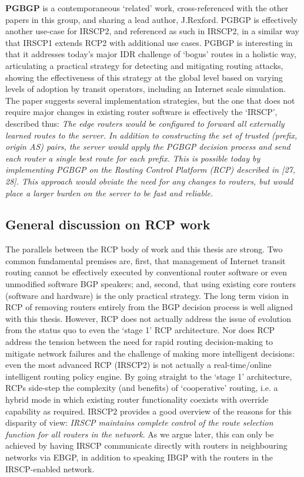 \textbf{PGBGP} \cite{Karlin2006} is a contemporaneous `related' work, cross-referenced with the other papers in this group, and sharing a lead author, J.Rexford.
PGBGP is effectively another use-case for IRSCP2, and referenced as such in IRSCP2, in a similar way that IRSCP1 extends RCP2 with additional use cases.
PGBGP is interesting in that it addresses today's major IDR challenge of `bogus' routes in a holistic way, articulating a practical strategy for detecting and mitigating routing attacks, showing the effectiveness of this strategy at the global level based on varying levels of adoption by transit operators, including an Internet scale simulation.
The paper suggests several implementation strategies, but the one that does not require major changes in existing router software is effectively the `IRSCP', described thus:
\emph{The edge routers would be configured to forward all externally learned routes to the server. In addition to constructing the set of trusted (prefix, origin AS) pairs, the server would apply the PGBGP decision process and send each router a single best route for each prefix. This is possible today by implementing PGBGP on the Routing Control Platform (RCP) described in [27, 28]. This approach would obviate the need for any changes to routers, but would place a larger burden on the server to be fast and reliable.}

\subsection{General discussion on RCP work}
The parallels between the RCP body of work and this thesis are strong. Two common fundamental premises are, first, that management of Internet transit routing cannot be effectively executed by conventional router software or even unmodified software BGP speakers; and, second, that using existing core routers (software and hardware) is the only practical strategy.
The long term vision in RCP of removing routers entirely from the BGP decision process is well aligned with this thesis. However, RCP does not actually address the issue of evolution from the status quo to even the `stage 1' RCP architecture.
Nor does RCP address the tension between the need for rapid routing decision-making to mitigate network failures and the challenge of making more intelligent decisions:  even the most advanced RCP (IRSCP2) is not actually a real-time/online intelligent routing policy engine. By going straight to the `stage 1' architecture, RCPs side-step the complexity (and benefits) of `cooperative' routing, i.e. a hybrid mode in which existing router functionality coexists with override capability as required.
IRSCP2 provides a good overview of the reasons for this disparity of view: \emph{IRSCP maintains complete control of the route selection function for all routers in the network}. As we argue later, this can only be achieved by having IRSCP communicate directly with routers in neighbouring networks via EBGP, in addition to speaking IBGP with the routers in the IRSCP-enabled network.

